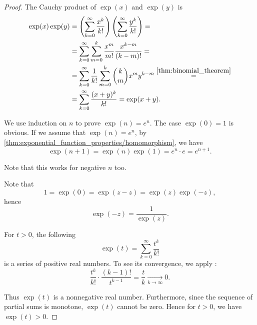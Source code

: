 \begin{proof}
   The Cauchy product of \( \exp(x) \) and \( \exp(y) \) is
  \begin{align*}
    \exp(x) \exp(y)
    &=
    \left( \sum_{k=0}^\infty \frac {x^k} {k!} \right) \left( \sum_{k=0}^\infty \frac {y^k} {k!} \right)
    = \\ &=
    \sum_{k=0}^\infty \sum_{m=0}^k \frac {x^m} {m!} \frac {x^{k-m}} {(k-m)!}
    = \\ &=
    \sum_{k=0}^\infty \frac 1 {k!} \sum_{m=0}^k \binom{k}{m} x^m y^{k-m}
    \overset {\ref{thm:binomial_theorem}} = \\ &=
    \sum_{k=0}^\infty \frac {(x + y)^k} {k!}
    =
    \exp(x + y).
  \end{align*}

   We use induction on \( n \) to prove \( \exp(n) = e^n \). The case \( \exp(0) = 1 \) is obvious. If we assume that \( \exp(n) = e^n \), by \cref{thm:exponential_function_properties/homomorphism}, we have
  \begin{equation*}
    \exp(n + 1)
    =
    \exp(n) \exp(1)
    =
    e^n \cdot e
    =
    e^{n+1}.
  \end{equation*}

  Note that this works for negative \( n \) too.

   Note that
  \begin{equation*}
    1 = \exp(0) = \exp(z - z) = \exp(z) \exp(-z),
  \end{equation*}
  hence
  \begin{equation*}
    \exp(-z) = \frac 1 {\exp(z)}.
  \end{equation*}

   For \( t > 0 \), the following
  \begin{equation*}
    \exp(t) = \sum_{k=0}^\infty \frac {t^k} {k!}
  \end{equation*}
  is a series of positive real numbers. To see its convergence, we apply :
  \begin{equation*}
    \frac {t^k} {k!} \cdot \frac {(k-1)!} {t^{k-1}}
    =
    \frac t k
    \xrightarrow[k \to \infty]{} 0.
  \end{equation*}

  Thus \( \exp(t) \) is a nonnegative real number. Furthermore, since the sequence of partial sums is monotone, \( \exp(t) \) cannot be zero. Hence for \( t > 0 \), we have \( \exp(t) > 0 \).


\end{proof}
